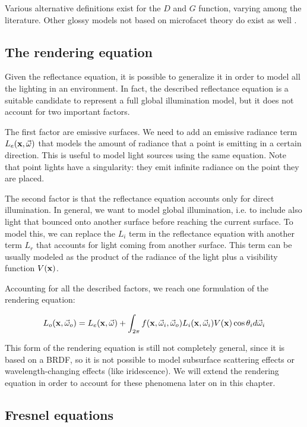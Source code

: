 Various alternative definitions exist for the $D$ and $G$ function, varying among the literature. Other glossy models not based on microfacet theory do exist as well \citep{montes2012overview}. 

\subsection{The rendering equation}

Given the reflectance equation, it is possible to generalize it in order to model all the lighting in an environment. In fact, the described reflectance equation is a suitable candidate to represent a full global illumination model, but it does not account for two important factors. 

The first factor are emissive surfaces. We need to add an emissive radiance term $L_e(\mathbf{x}, \vec{\omega})$ that models the amount of radiance that a point is emitting in a certain direction. This is useful to model light sources using the same equation. Note that point lights have a singularity: they emit infinite radiance on the point they are placed.

The second factor is that the reflectance equation accounts only for direct illumination. In general, we want to model global illumination, i.e. to include also light that bounced onto another surface before reaching the current surface. To model this, we can replace the $L_i$ term in the reflectance equation with another term $L_r$ that accounts for light coming from another surface. This term can be usually modeled as the product of the radiance of the light plus a visibility function $V(\mathbf{x})$.

Accounting for all the described factors, we reach one formulation of the rendering equation:

$$
L_o(\mathbf{x}, \vec{\omega}_o) = L_e(\mathbf{x}, \vec{\omega}) + \int_{2\pi} f(\mathbf{x}, \vec{\omega}_i, \vec{\omega}_o) L_i(\mathbf{x}, \vec{\omega}_i) V(\mathbf{x}) \cos\theta_i d\vec{\omega}_i
$$

This form of the rendering equation is still not completely general, since it is based on a BRDF, so it is not possible to model subsurface scattering effects or wavelength-changing effects (like iridescence). We will extend the rendering equation in order to account for these phenomena later on in this chapter.

\subsection{Fresnel equations}
\label{sec:fresnel}


